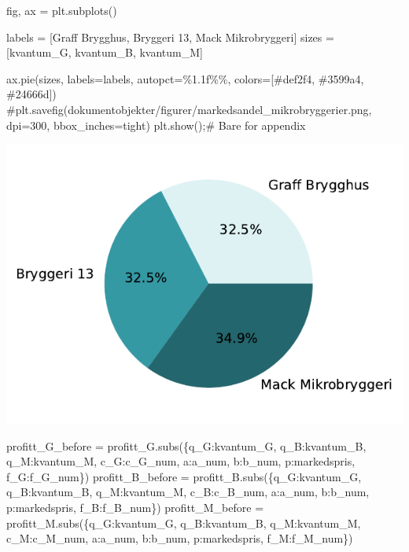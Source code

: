 \documentclass[
  12pt,
  a4paper,
  DIV=11,
  numbers=noendperiod]{scrartcl}
\newenvironment{Shaded}{\begin{snugshade}}{\end{snugshade}}
\newcommand{\CommentTok}[1]{\textcolor[rgb]{0.37,0.37,0.37}{#1}}
\newcommand{\NormalTok}[1]{\textcolor[rgb]{0.00,0.23,0.31}{#1}}
\newcommand{\OperatorTok}[1]{\textcolor[rgb]{0.37,0.37,0.37}{#1}}
\newcommand{\SpecialCharTok}[1]{\textcolor[rgb]{0.37,0.37,0.37}{#1}}
\newcommand{\StringTok}[1]{\textcolor[rgb]{0.13,0.47,0.30}{#1}}
\begin{document}
\begin{Shaded}
\begin{Highlighting}[]
\NormalTok{fig, ax }\OperatorTok{=}\NormalTok{ plt.subplots()}

\NormalTok{labels }\OperatorTok{=}\NormalTok{ [}\StringTok{\textquotesingle{}Graff Brygghus\textquotesingle{}}\NormalTok{, }\StringTok{\textquotesingle{}Bryggeri 13\textquotesingle{}}\NormalTok{, }\StringTok{\textquotesingle{}Mack Mikrobryggeri\textquotesingle{}}\NormalTok{]}
\NormalTok{sizes }\OperatorTok{=}\NormalTok{ [kvantum\_G, kvantum\_B, kvantum\_M]}

\NormalTok{ax.pie(sizes, labels}\OperatorTok{=}\NormalTok{labels, autopct}\OperatorTok{=}\StringTok{\textquotesingle{}}\SpecialCharTok{\%1.1f\%\%}\StringTok{\textquotesingle{}}\NormalTok{, colors}\OperatorTok{=}\NormalTok{[}\StringTok{\textquotesingle{}\#def2f4\textquotesingle{}}\NormalTok{, }\StringTok{\textquotesingle{}\#3599a4\textquotesingle{}}\NormalTok{, }\StringTok{\textquotesingle{}\#24666d\textquotesingle{}}\NormalTok{])}
\CommentTok{\#plt.savefig(\textquotesingle{}dokumentobjekter/figurer/markedsandel\_mikrobryggerier.png\textquotesingle{}, dpi=300, bbox\_inches=\textquotesingle{}tight\textquotesingle{})}
\NormalTok{plt.show()}\OperatorTok{;}\CommentTok{\# Bare for appendix}
\end{Highlighting}
\end{Shaded}

\includegraphics{18_SOK2030_mappeoppgave_2_V24_files/figure-pdf/cell-33-output-1.pdf}

\begin{Shaded}
\begin{Highlighting}[]
\NormalTok{profitt\_G\_before }\OperatorTok{=}\NormalTok{ profitt\_G.subs(\{q\_G:kvantum\_G, q\_B:kvantum\_B, q\_M:kvantum\_M, c\_G:c\_G\_num, a:a\_num, b:b\_num, p:markedspris, f\_G:f\_G\_num\})}
\NormalTok{profitt\_B\_before }\OperatorTok{=}\NormalTok{ profitt\_B.subs(\{q\_G:kvantum\_G, q\_B:kvantum\_B, q\_M:kvantum\_M, c\_B:c\_B\_num, a:a\_num, b:b\_num, p:markedspris, f\_B:f\_B\_num\})}
\NormalTok{profitt\_M\_before }\OperatorTok{=}\NormalTok{ profitt\_M.subs(\{q\_G:kvantum\_G, q\_B:kvantum\_B, q\_M:kvantum\_M, c\_M:c\_M\_num, a:a\_num, b:b\_num, p:markedspris, f\_M:f\_M\_num\})}
\end{Highlighting}
\end{Shaded}
\end{document}
